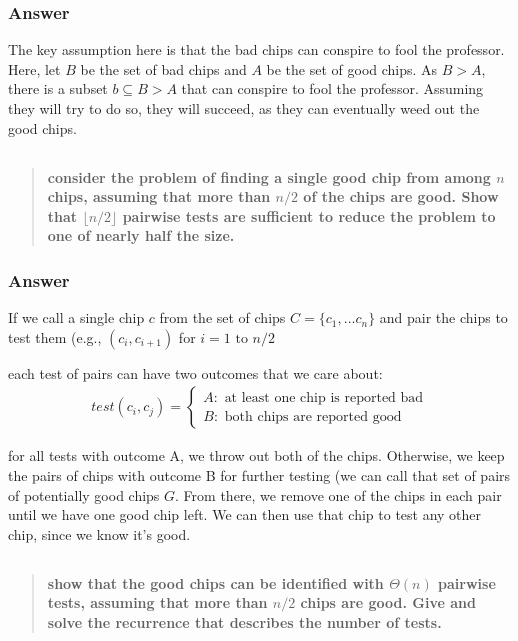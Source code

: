\documentclass[titlepage]{article}\usepackage[]{graphicx}\usepackage[]{color}
\begin{document}
\subsubsection{Answer}
The key assumption here is that the bad chips can conspire to fool the professor.
Here, let $B$ be the set of bad chips and $A$ be the set of good chips. As
$B>A$, there is a subset $b \subseteq B > A$ that can conspire to fool the
professor. Assuming they will try to do so, they will succeed, as they can
eventually weed out the good chips. 

  \subsection{ }
  \begin{quote}
  \textbf{consider the problem of finding a single good chip from among $n$ chips,
	assuming that more than $n/2$ of the chips are good. Show that $\lfloor n/2 \rfloor$ 
	pairwise tests are sufficient to reduce the problem to one of nearly
	half the size.}
  \end{quote}

  \subsubsection{Answer}
  If we call a single chip $c$ from the set of chips $C=\{c_1,\dots c_n\}$ and
  pair the chips to test them (e.g., $(c_i, c_{i+1})$ for $i = 1 \text{ to } n/2$

  each test of pairs can have two outcomes that we care about: 
  \begin{align*}
	  test (c_i, c_j) = \begin{cases}
		  A: \text{ at least one chip is reported bad} \\
		  B: \text{ both chips are reported good} 
	  \end{cases}
  \end{align*}

  for all tests with outcome A, we throw out both of the chips. Otherwise, we
  keep the pairs of chips with outcome B for further testing (we can call that
  set of pairs of potentially good chips $G$. From there, we remove one of the
  chips in each pair until we have one good chip left. We can then use that
  chip to test any other chip, since we know it's good. 

  
  \subsection{}
  \begin{quote}
  \textbf{show that the good chips can be identified with $\Theta(n)$ pairwise tests,
	assuming that more than $n/2$ chips are good. Give and solve the recurrence
	that describes the number of tests. }
  \end{quote}
\end{document}
